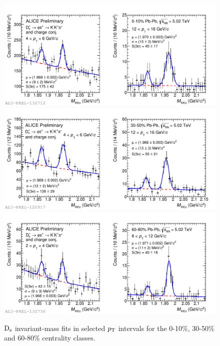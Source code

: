  
\begin{figure}[!htbp]
 \begin{center}
  \includegraphics[width=.9\textwidth]{FigCap5/MassDs_PbPb010_5TeV_pt_4-6_12-16.pdf}
  \includegraphics[width=.9\textwidth]{FigCap5/MassDs_PbPb3050_5TeV_pt_4-6_12-16.pdf}
  \includegraphics[width=.9\textwidth]{FigCap5/MassDs_PbPb6080_5TeV_pt_2-4_8-12.pdf}
\end{center}
 \caption{${\rm D_s}$ invariant-mass fits in selected $p_{\rm T}$ intervals for the 0-10\%, 30-50$\%$ and 60-80\% centrality classes. }
 \label{fig:FigInvMassDs_pbpb} 
\end{figure} 
 

